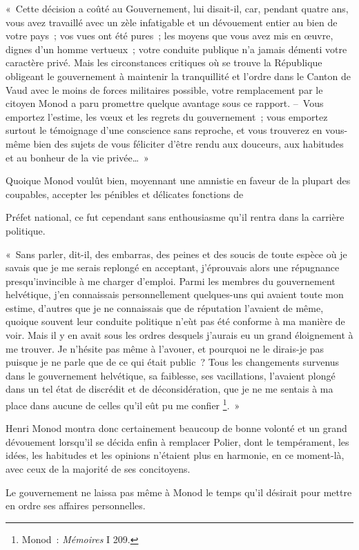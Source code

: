 \documentclass[french,twoside]{book} %
\newenvironment{quoteblock}%
  {\begin{quoting}}
  {\end{quoting}}
\newenvironment{quotebar}{%
    \def\FrameCommand{{\color{rubric!10!}\vrule width 0.5em} \hspace{0.9em}}%
    \def\OuterFrameSep{\itemsep} %
    \MakeFramed {\advance\hsize-\width \FrameRestore}
  }%
  {%
    \endMakeFramed
  }
\renewenvironment{quoteblock}%
  {%
    \savenotes
    \setstretch{0.9}
    \normalfont
    \begin{quotebar}
  }
  {%
    \end{quotebar}
    \spewnotes
  }
\begin{document}
\begin{quoteblock}
 \noindent « Cette décision a coûté au Gouvernement, lui disait-il, car, pendant quatre ans, vous avez travaillé avec un zèle infatigable et un dévouement entier au bien de votre pays ; vos vues ont été pures ; les moyens que vous avez mis en œuvre, dignes d’un homme vertueux ; votre conduite publique n’a jamais démenti votre caractère privé. Mais les circonstances critiques où se trouve la République obligeant le gouvernement à maintenir la tranquillité et l’ordre dans le Canton de Vaud avec le moins de forces militaires possible, votre remplacement par le citoyen Monod a paru promettre quelque avantage sous ce rapport. – Vous emportez l’estime, les vœux et les regrets du gouvernement ; vous emportez surtout le témoignage d’une conscience sans reproche, et vous trouverez en vous-même bien des sujets de vous féliciter d’être rendu aux douceurs, aux habitudes et au bonheur de la vie privée… »
 \end{quoteblock}

\noindent Quoique Monod voulût bien, moyennant une amnistie en faveur de la plupart des coupables, accepter les pénibles et délicates fonctions de\par
Préfet national, ce fut cependant sans enthousiasme qu’il rentra dans la carrière politique.\par

\begin{quoteblock}
 \noindent « Sans parler, dit-il, des embarras, des peines et des soucis de toute espèce où je savais que je me serais replongé en acceptant, j’éprouvais alors une répugnance presqu’invincible à me charger d’emploi. Parmi les membres du gouvernement helvétique, j’en connaissais personnellement quelques-uns qui avaient toute mon estime, d’autres que je ne connaissais que de réputation l’avaient de même, quoique souvent leur conduite politique n’eùt pas été conforme à ma manière de voir. Mais il y en avait sous les ordres desquels j’aurais eu un grand éloignement à me trouver. Je n’hésite pas même à l’avouer, et pourquoi ne le dirais-je pas puisque je ne parle que de ce qui était public ? Tous les changements survenus dans le gouvernement helvétique, sa faiblesse, ses vacillations, l’avaient plongé dans un tel état de discrédit et de déconsidération, que je ne me sentais à ma place dans aucune de celles qu’il eût pu me confier \footnote{Monod : \emph{Mémoires} I 209.}. »
 \end{quoteblock}

\noindent Henri Monod montra donc certainement beaucoup de bonne volonté et un grand dévouement lorsqu’il se décida enfin à remplacer Polier, dont le tempérament, les idées, les habitudes et les opinions n’étaient plus en harmonie, en ce moment-là, avec ceux de la majorité de ses concitoyens.\par
Le gouvernement ne laissa pas même à Monod le temps qu’il désirait pour mettre en ordre ses affaires personnelles.\par
\end{document}
